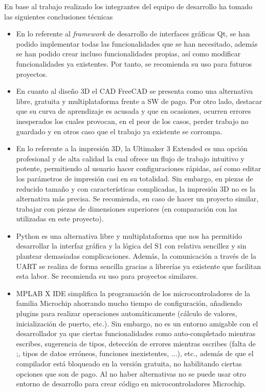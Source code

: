 En base al trabajo realizado los integrantes del equipo de desarrollo ha tomado las siguientes conclusiones técnicas 

\begin{itemize}

    \item En lo referente al \textit{framework} de desarrollo de interfaces gráficas Qt, se han podido implementar todas las funcionalidades que se han necesitado, además se han podido crear incluso funcionalidades propias, así como modificar funcionalidades ya existentes. Por tanto, se recomienda su uso para futuros proyectos.
    \item En cuanto al diseño 3D el CAD FreeCAD se presenta como una alternativa libre, gratuita y multiplataforma frente a \ac{SW} de pago. Por otro lado, destacar que su curva de aprendizaje es acusada y que en ocasiones, ocurren errores inesperados los cuales provocan, en el peor de los casos, perder trabajo no guardado y en otros caso que el trabajo ya existente se corrompa.
    \item En lo referente a la impresión 3D, la Ultimaker 3 Extended es una opción profesional y de alta calidad la cual ofrece un flujo de trabajo intuitivo y potente, permitiendo al usuario hacer configuraciones rápidas, así como editar los parámetros de impresión casi en su totalidad. Sin embargo, en piezas de reducido tamaño y con características complicadas, la impresión 3D no es la alternativa más precisa. Se recomienda, en caso de hacer un proyecto similar, trabajar con piezas de dimensiones superiores (en comparación con las utilizadas en este proyecto).
    \item Python es una alternativa libre y multiplataforma que nos ha permitido desarrollar la interfaz gráfica y la lógica del \ac{S1} con relativa sencillez y sin plantear demasiadas complicaciones. Además, la comunicación a través de la UART se realiza de forma sencilla gracias a librerías ya existente que facilitan esta labor. Se recomienda su uso para proyectos similares.
    \item MPLAB X IDE simplifica la programación de los microcontroladores de la familia Microchip ahorrando mucho tiempo de configuración, añadiendo plugins para realizar operaciones automáticamente (cálculo de valores, inicialización de puerto, etc.). Sin embargo, no es un entorno amigable con el desarrollador ya que ciertas funcionalidades como auto-completado mientras escribes, sugerencia de tipos, detección de errores mientras escribes (falta de ;, tipos de datos erróneos, funciones inexistentes, ...), etc., además de que el compilador está bloqueado en la versión gratuita, no habilitando ciertas opciones que son de pago. Al no haber alternativas no se puede usar otro entorno de desarrollo para crear código en microcontroladores Microchip.

\end{itemize}
